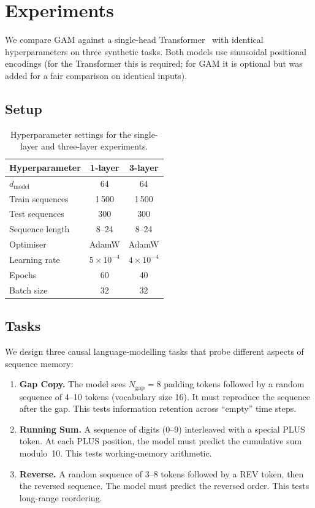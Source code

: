 \documentclass[11pt,a4paper]{article}
\begin{document}
\section{Experiments}
\label{sec:exp}

We compare GAM against a single-head Transformer~\cite{vaswani2017attention}
with identical hyperparameters on three synthetic tasks.  Both models
use sinusoidal positional encodings (for the Transformer this is
required; for GAM it is optional but was added for a fair comparison
on identical inputs).

\subsection{Setup}
\label{sec:setup}

\begin{table}[h]
\centering
\begin{tabular}{lcc}
\toprule
Hyperparameter & 1-layer & 3-layer \\
\midrule
$d_\text{model}$ & 64 & 64 \\
Train sequences & 1\,500 & 1\,500 \\
Test sequences & 300 & 300 \\
Sequence length & 8--24 & 8--24 \\
Optimiser & AdamW & AdamW \\
Learning rate & $5\times10^{-4}$ & $4\times10^{-4}$ \\
Epochs & 60 & 40 \\
Batch size & 32 & 32 \\
\bottomrule
\end{tabular}
\caption{Hyperparameter settings for the single-layer and three-layer
experiments.}
\label{tab:hp}
\end{table}

\subsection{Tasks}
\label{sec:tasks}

We design three causal language-modelling tasks that probe different
aspects of sequence memory:

\begin{enumerate}[nosep]
  \item \textbf{Gap Copy.} The model sees $N_\text{gap}=8$ padding tokens
    followed by a random sequence of 4--10 tokens (vocabulary size 16).
    It must reproduce the sequence after the gap.  This tests
    information retention across ``empty'' time steps.
  \item \textbf{Running Sum.} A sequence of digits (0--9) interleaved
    with a special PLUS token.  At each PLUS position, the model must
    predict the cumulative sum modulo~10.  This tests working-memory
    arithmetic.
  \item \textbf{Reverse.} A random sequence of 3--8 tokens followed by
    a REV token, then the reversed sequence.  The model must predict
    the reversed order.  This tests long-range reordering.
\end{enumerate}
\end{document}
